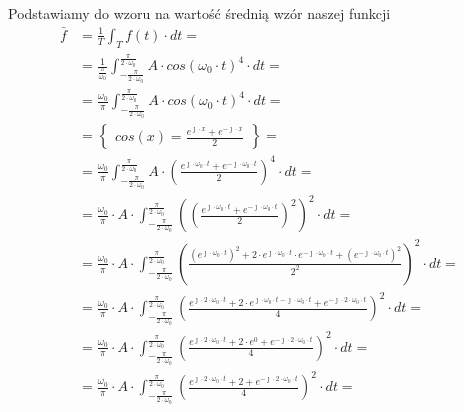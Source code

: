 \begin{task}
Podstawiamy do wzoru na wartość średnią wzór naszej funkcji
\begin{align*}
\bar{f} &=\frac{1}{T}\int_{T}^{} f(t) \cdot dt=\\
&=\frac{1}{\frac{\pi}{\omega_0}}\int_{-\frac{\pi}{2\cdot\omega_0}}^{\frac{\pi}{2\cdot\omega_0}} A \cdot cos\left(\omega_0 \cdot t\right)^4 \cdot dt=\\
&=\frac{\omega_0}{\pi}\int_{-\frac{\pi}{2\cdot\omega_0}}^{\frac{\pi}{2\cdot\omega_0}} A \cdot cos\left(\omega_0 \cdot t\right)^4 \cdot dt=\\
&=\begin{Bmatrix}cos(x)=\frac{e^{\jmath \cdot x}+e^{-\jmath \cdot x}}{2}\end{Bmatrix}=\\
&=\frac{\omega_0}{\pi}\int_{-\frac{\pi}{2\cdot\omega_0}}^{\frac{\pi}{2\cdot\omega_0}} A \cdot \left( \frac{e^{\jmath \cdot \omega_0 \cdot t}+e^{-\jmath \cdot \omega_0 \cdot t}}{2} \right)^4 \cdot dt=\\
&=\frac{\omega_0}{\pi} \cdot A \cdot \int_{-\frac{\pi}{2\cdot\omega_0}}^{\frac{\pi}{2\cdot\omega_0}} \left( \left( \frac{e^{\jmath \cdot \omega_0 \cdot t}+e^{-\jmath \cdot \omega_0 \cdot t}}{2} \right)^2\right)^2 \cdot dt=\\
&=\frac{\omega_0}{\pi} \cdot A \cdot \int_{-\frac{\pi}{2\cdot\omega_0}}^{\frac{\pi}{2\cdot\omega_0}} \left(  \frac{\left(e^{\jmath \cdot \omega_0 \cdot t}\right)^2+2\cdot e^{\jmath \cdot \omega_0 \cdot t} \cdot e^{-\jmath \cdot \omega_0 \cdot t} + \left(e^{-\jmath \cdot \omega_0 \cdot t}\right)^2}{2^2} \right)^2 \cdot dt=\\
&=\frac{\omega_0}{\pi} \cdot A \cdot \int_{-\frac{\pi}{2\cdot\omega_0}}^{\frac{\pi}{2\cdot\omega_0}} \left(  \frac{e^{\jmath \cdot 2 \cdot \omega_0 \cdot t}+2\cdot e^{\jmath \cdot \omega_0 \cdot t -\jmath \cdot \omega_0 \cdot t} + e^{-\jmath \cdot 2 \cdot \omega_0 \cdot t}}{4} \right)^2 \cdot dt=\\
&=\frac{\omega_0}{\pi} \cdot A \cdot \int_{-\frac{\pi}{2\cdot\omega_0}}^{\frac{\pi}{2\cdot\omega_0}} \left(  \frac{e^{\jmath \cdot 2 \cdot \omega_0 \cdot t}+2\cdot e^{0} + e^{-\jmath \cdot 2 \cdot \omega_0 \cdot t}}{4} \right)^2 \cdot dt=\\
&=\frac{\omega_0}{\pi} \cdot A \cdot \int_{-\frac{\pi}{2\cdot\omega_0}}^{\frac{\pi}{2\cdot\omega_0}} \left(  \frac{e^{\jmath \cdot 2 \cdot \omega_0 \cdot t}+2 + e^{-\jmath \cdot 2 \cdot \omega_0 \cdot t}}{4} \right)^2 \cdot dt=\\

\end{align*}
\end{task}
